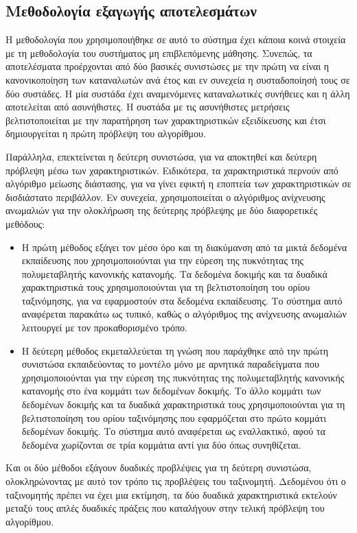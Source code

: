 \subsection{Μεθοδολογία εξαγωγής αποτελεσμάτων}
Η μεθοδολογία που χρησιμοποιήθηκε σε αυτό το σύστημα έχει κάποια κοινά στοιχεία με τη μεθοδολογία του συστήματος μη επιβλεπόμενης μάθησης. Συνεπώς, τα αποτελέσματα προέρχονται από δύο βασικές συνιστώσες με την πρώτη να είναι η κανονικοποίηση των καταναλωτών ανά έτος και εν συνεχεία η συσταδοποίησή τους σε δύο συστάδες. Η μία συστάδα έχει αναμενόμενες καταναλωτικές συνήθειες και η άλλη αποτελείται από ασυνήθιστες. H συστάδα με τις ασυνήθιστες μετρήσεις βελτιστοποιείται με την παρατήρηση των χαρακτηριστικών εξειδίκευσης και έτσι δημιουργείται η πρώτη πρόβλεψη του αλγορίθμου.\par
Παράλληλα, επεκτείνεται η δεύτερη συνιστώσα, για να αποκτηθεί και δεύτερη πρόβλεψη μέσω των χαρακτηριστικών. Ειδικότερα, τα χαρακτηριστικά περνούν από αλγόριθμο μείωσης διάστασης, για να γίνει εφικτή η εποπτεία των χαρακτηριστικών σε δισδιάστατο περιβάλλον. Εν συνεχεία, χρησιμοποιείται ο αλγόριθμος ανίχνευσης ανωμαλιών για την ολοκλήρωση της δεύτερης πρόβλεψης με δύο διαφορετικές μεθόδους:
\begin{itemize}
\item Η πρώτη μέθοδος εξάγει τον μέσο όρο και τη διακύμανση από τα μικτά δεδομένα εκπαίδευσης που χρησιμοποιούνται για την εύρεση της πυκνότητας της πολυμεταβλητής κανονικής κατανομής. Τα δεδομένα δοκιμής και τα δυαδικά χαρακτηριστικά τους χρησιμοποιούνται για τη βελτιστοποίηση του ορίου ταξινόμησης, για να εφαρμοστούν στα δεδομένα εκπαίδευσης. Το σύστημα αυτό αναφέρεται παρακάτω ως τυπικό, καθώς ο αλγόριθμος της ανίχνευσης ανωμαλιών λειτουργεί με τον προκαθορισμένο τρόπο.
\item Η δεύτερη μέθοδος εκμεταλλεύεται τη γνώση που παράχθηκε από την πρώτη συνιστώσα εκπαιδεύοντας το μοντέλο μόνο με αρνητικά παραδείγματα που χρησιμοποιούνται για την εύρεση της πυκνότητας της πολυμεταβλητής κανονικής κατανομής στο ένα κομμάτι των δεδομένων δοκιμής. Το άλλο κομμάτι των δεδομένων δοκιμής και τα δυαδικά χαρακτηριστικά τους χρησιμοποιούνται για τη βελτιστοποίηση του ορίου ταξινόμησης που εφαρμόζεται στο πρώτο κομμάτι δεδομένων δοκιμής. Το σύστημα αυτό αναφέρεται ως εναλλακτικό, αφού τα δεδομένα χωρίζονται σε τρία κομμάτια αντί για δύο όπως συνηθίζεται.
\end{itemize}
\par Και οι δύο μέθοδοι εξάγουν δυαδικές προβλέψεις για τη δεύτερη συνιστώσα, ολοκληρώνοντας με αυτό τον τρόπο τις προβλέψεις του ταξινομητή. Δεδομένου ότι ο ταξινομητής πρέπει να έχει μια εκτίμηση, τα δύο δυαδικά χαρακτηριστικά εκτελούν μεταξύ τους απλές δυαδικές πράξεις που καταλήγουν στην τελική πρόβλεψη του αλγορίθμου.
